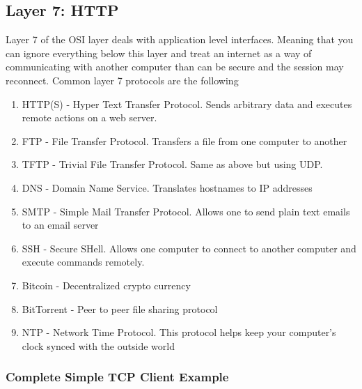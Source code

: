 \documentclass[]{article}
\begin{document}
\subsection{Layer 7: HTTP}\label{layer-7-http}

Layer 7 of the OSI layer deals with application level interfaces.
Meaning that you can ignore everything below this layer and treat an
internet as a way of communicating with another computer than can be
secure and the session may reconnect. Common layer 7 protocols are the
following

\begin{enumerate}
\item
  HTTP(S) - Hyper Text Transfer Protocol. Sends arbitrary data and
  executes remote actions on a web server.
\item
  FTP - File Transfer Protocol. Transfers a file from one computer to
  another
\item
  TFTP - Trivial File Transfer Protocol. Same as above but using UDP.
\item
  DNS - Domain Name Service. Translates hostnames to IP addresses
\item
  SMTP - Simple Mail Transfer Protocol. Allows one to send plain text
  emails to an email server
\item
  SSH - Secure SHell. Allows one computer to connect to another computer
  and execute commands remotely.
\item
  Bitcoin - Decentralized crypto currency
\item
  BitTorrent - Peer to peer file sharing protocol
\item
  NTP - Network Time Protocol. This protocol helps keep your computer's
  clock synced with the outside world
\end{enumerate}

\subsubsection{Complete Simple TCP Client
Example}\label{complete-simple-tcp-client-example}
\end{document}
